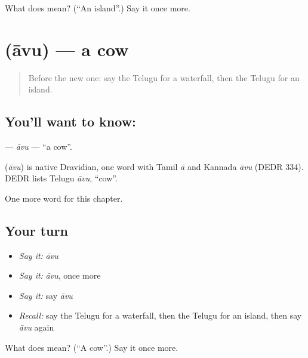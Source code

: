 \begin{tcolorbox}[breakable,colback=teal!4,colframe=teal!35!black,title={Before you move on}]
What does  mean? (\textquotedblleft{}An island\textquotedblright{}.) Say it once more.
\end{tcolorbox}
\section[\texorpdfstring{\te{ఆవు} (āvu)}{ఆవు (āvu)}]{ (āvu) — a cow}

\label{lesson:TE-C122-avu}



\begin{quote}
Before the new one: say the Telugu for a waterfall, then the Telugu for an island.
\end{quote}

\subsection*{You'll want to know: }
\textbf{} — \emph{āvu} — \textquotedblleft{}a cow\textquotedblright{}.

\begin{cousinweb}
\textbf{} (\emph{āvu}) is native Dravidian, one word with Tamil \emph{ā} and Kannada \emph{āvu} (DEDR 334). DEDR lists Telugu \emph{āvu}, \textquotedblleft{}cow\textquotedblright{}.
\end{cousinweb}

\begin{grammarlens}[title={What you've built}]
One more word for this chapter.
\end{grammarlens}

\subsection*{Your turn}
\begin{itemize}
\raggedright
  \item \emph{Say it:} \emph{āvu}
  \item \emph{Say it:} \emph{āvu}, once more
  \item \emph{Say it:} say \emph{āvu}
  \item \emph{Recall:} say the Telugu for a waterfall, then the Telugu for an island, then say \emph{āvu} again
\end{itemize}

\begin{tcolorbox}[breakable,colback=teal!4,colframe=teal!35!black,title={Before you move on}]
What does  mean? (\textquotedblleft{}A cow\textquotedblright{}.) Say it once more.
\end{tcolorbox}
